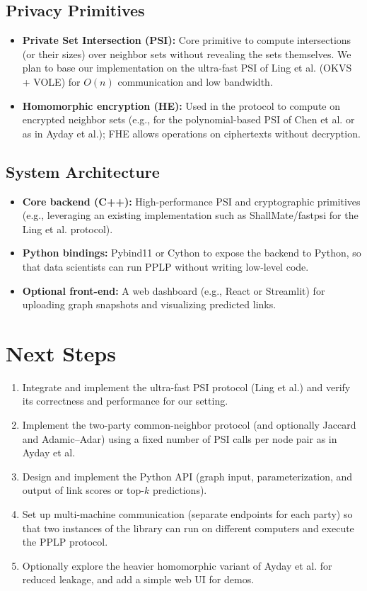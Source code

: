 \documentclass[sigconf]{acmart}
\begin{document}
\subsection{Privacy Primitives}
\begin{itemize}
  \item \textbf{Private Set Intersection (PSI):} Core primitive to compute intersections (or their sizes) over neighbor sets without revealing the sets themselves. We plan to base our implementation on the ultra-fast PSI of Ling et al. (OKVS + VOLE) for $O(n)$ communication and low bandwidth.
  \item \textbf{Homomorphic encryption (HE):} Used in the protocol to compute on encrypted neighbor sets (e.g., for the polynomial-based PSI of Chen et al. or as in Ayday et al.); FHE allows operations on ciphertexts without decryption.
\end{itemize}

\subsection{System Architecture}
\begin{itemize}
  \item \textbf{Core backend (C++):} High-performance PSI and cryptographic primitives (e.g., leveraging an existing implementation such as ShallMate/fastpsi for the Ling et al. protocol).
  \item \textbf{Python bindings:} Pybind11 or Cython to expose the backend to Python, so that data scientists can run PPLP without writing low-level code.
  \item \textbf{Optional front-end:} A web dashboard (e.g., React or Streamlit) for uploading graph snapshots and visualizing predicted links.
\end{itemize}

\section{Next Steps}

\begin{enumerate}
  \item Integrate and implement the ultra-fast PSI protocol (Ling et al.) and verify its correctness and performance for our setting.
  \item Implement the two-party common-neighbor protocol (and optionally Jaccard and Adamic--Adar) using a fixed number of PSI calls per node pair as in Ayday et al.
  \item Design and implement the Python API (graph input, parameterization, and output of link scores or top-$k$ predictions).
  \item Set up multi-machine communication (separate endpoints for each party) so that two instances of the library can run on different computers and execute the PPLP protocol.
  \item Optionally explore the heavier homomorphic variant of Ayday et al. for reduced leakage, and add a simple web UI for demos.
\end{enumerate}
\end{document}
